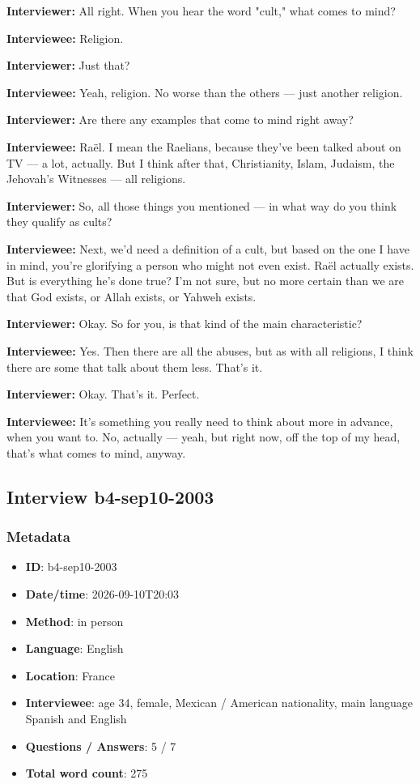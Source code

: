 \textbf{Interviewer:} All right. When you hear the word "cult," what comes to mind?

\textbf{Interviewee:} Religion.

\textbf{Interviewer:} Just that?

\textbf{Interviewee:} Yeah, religion. No worse than the others — just another religion.

\textbf{Interviewer:} Are there any examples that come to mind right away?

\textbf{Interviewee:} Raël. I mean the Raelians, because they've been talked about on TV — a lot, actually. But I think after that, Christianity, Islam, Judaism, the Jehovah's Witnesses — all religions.

\textbf{Interviewer:} So, all those things you mentioned — in what way do you think they qualify as cults?

\textbf{Interviewee:} Next, we'd need a definition of a cult, but based on the one I have in mind, you're glorifying a person who might not even exist. Raël actually exists. But is everything he's done true? I'm not sure, but no more certain than we are that God exists, or Allah exists, or Yahweh exists.

\textbf{Interviewer:} Okay. So for you, is that kind of the main characteristic?

\textbf{Interviewee:} Yes. Then there are all the abuses, but as with all religions, I think there are some that talk about them less. That's it.

\textbf{Interviewer:} Okay. That's it. Perfect.

\textbf{Interviewee:} It's something you really need to think about more in advance, when you want to. No, actually — yeah, but right now, off the top of my head, that's what comes to mind, anyway.

\subsection{Interview b4-sep10-2003}\label{int:b4-sep10-2003}
\subsubsection*{Metadata}
\begin{itemize}
  \item \textbf{ID}: b4-sep10-2003
  \item \textbf{Date/time}: 2026-09-10T20:03
  \item \textbf{Method}: in person
  \item \textbf{Language}: English
  \item \textbf{Location}: France
  \item \textbf{Interviewee}: age 34, female, Mexican / American nationality, main language Spanish and English
  \item \textbf{Questions / Answers}: 5 / 7
  \item \textbf{Total word count}: 275
\end{itemize}

